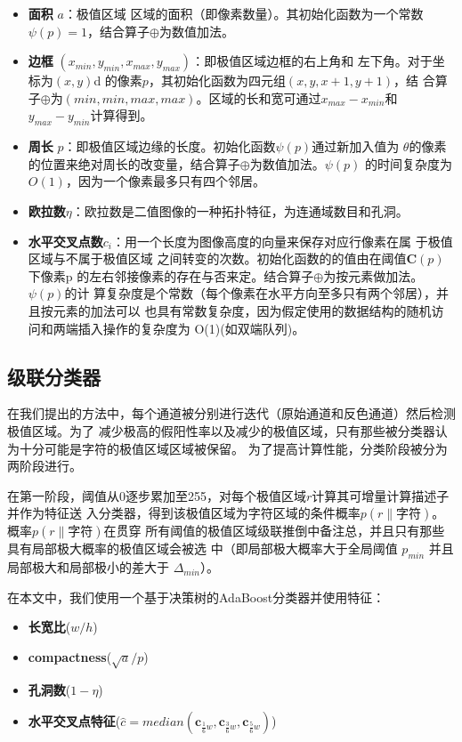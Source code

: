 \documentclass[UTF8]{ctexart}
\begin{document}
\begin{itemize}
\item \textbf{面积} $a$：极值区域 区域的面积（即像素数量）。其初始化函数为一个常数
  $\psi(p)=1$，结合算子$\oplus$为数值加法。
\item \textbf{边框} $(x_{min}, y_{min}, x_{max}, y_{max})$：即极值区域边框的右上角和
  左下角。对于坐标为$(x,y)$d 的像素$p$，其初始化函数为四元组$(x,y,x+1,y+1)$，结
  合算子$\oplus$为$(min,min,max,max)$。区域的长和宽可通过$x_{max}-x_{min}$和
  $y_{max}-y_{min}$计算得到。
\item \textbf{周长} $p$：即极值区域边缘的长度。初始化函数$\psi(p)$通过新加入值为
  $\theta$的像素的位置来绝对周长的改变量，结合算子$\oplus$为数值加法。$\psi(p)$
  的时间复杂度为$O(1)$，因为一个像素最多只有四个邻居。
\item \textbf{欧拉数$\eta$}：欧拉数是二值图像的一种拓扑特征，为连通域数目和孔洞。
\item \textbf{水平交叉点数$c_i$}：用一个长度为图像高度的向量来保存对应行像素在属
  于极值区域与不属于极值区域 之间转变的次数。初始化函数的的值由在阈值$\mathbf{C}(p)$下像素p
  的左右邻接像素的存在与否来定。结合算子$\oplus$为按元素做加法。$\psi(p)$的计
  算复杂度是个常数（每个像素在水平方向至多只有两个邻居），并且按元素的加法可以
  也具有常数复杂度，因为假定使用的数据结构的随机访问和两端插入操作的复杂度为
  O(1)(如双端队列)。
\end{itemize}

\subsection{级联分类器}

在我们提出的方法中，每个通道被分别进行迭代（原始通道和反色通道）然后检测极值区域。为了
减少极高的假阳性率以及减少的极值区域，只有那些被分类器认为十分可能是字符的极值区域区域被保留。
为了提高计算性能，分类阶段被分为两阶段进行。

在第一阶段，阈值从0逐步累加至255，对每个极值区域$r$计算其可增量计算描述子并作为特征送
入分类器，得到该极值区域为字符区域的条件概率$p(r\|字符)$。概率$p(r\|字符)$在贯穿
所有阈值的极值区域级联推倒中备注总，并且只有那些具有局部极大概率的极值区域会被选
中（即局部极大概率大于全局阈值 $p_{min}$ 并且局部极大和局部极小的差大于
$\Delta_{min}$）。

在本文中，我们使用一个基于决策树的AdaBoost分类器并使用特征：

\begin{itemize}
\item \textbf{长宽比}($w/h$)
\item \textbf{compactness}($\sqrt{a}/p$)
\item \textbf{孔洞数}($1-\eta$)
\item \textbf{水平交叉点特征}($\hat{c}=median(\mathbf{c}_{\frac{1}{6}w}, \mathbf{c}_{\frac{3}{6}w}, \mathbf{c}_{\frac{5}{6}w})$)
\end{itemize}
\end{document}

